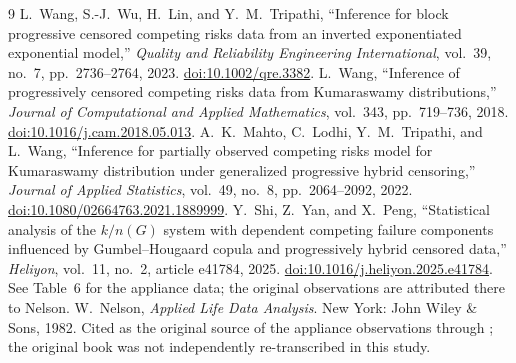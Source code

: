 \documentclass[a4paper,11pt]{article}
\begin{document}
\begin{thebibliography}{9}
 L.~Wang, S.-J.~Wu, H.~Lin, and Y.~M.~Tripathi, ``Inference for block progressive censored competing risks data from an inverted exponentiated exponential model,'' \emph{Quality and Reliability Engineering International}, vol.~39, no.~7, pp.~2736--2764, 2023. \href{https://doi.org/10.1002/qre.3382}{doi:10.1002/qre.3382}.
 L.~Wang, ``Inference of progressively censored competing risks data from Kumaraswamy distributions,'' \emph{Journal of Computational and Applied Mathematics}, vol.~343, pp.~719--736, 2018. \href{https://doi.org/10.1016/j.cam.2018.05.013}{doi:10.1016/j.cam.2018.05.013}.
 A.~K.~Mahto, C.~Lodhi, Y.~M.~Tripathi, and L.~Wang, ``Inference for partially observed competing risks model for Kumaraswamy distribution under generalized progressive hybrid censoring,'' \emph{Journal of Applied Statistics}, vol.~49, no.~8, pp.~2064--2092, 2022. \href{https://doi.org/10.1080/02664763.2021.1889999}{doi:10.1080/02664763.2021.1889999}.
 Y.~Shi, Z.~Yan, and X.~Peng, ``Statistical analysis of the $k/n(G)$ system with dependent competing failure components influenced by Gumbel--Hougaard copula and progressively hybrid censored data,'' \emph{Heliyon}, vol.~11, no.~2, article e41784, 2025. \href{https://doi.org/10.1016/j.heliyon.2025.e41784}{doi:10.1016/j.heliyon.2025.e41784}. See Table~6 for the appliance data; the original observations are attributed there to Nelson.
 W.~Nelson, \emph{Applied Life Data Analysis}. New York: John Wiley \& Sons, 1982. Cited as the original source of the appliance observations through \cite{shi2025}; the original book was not independently re-transcribed in this study.
\end{thebibliography}
\end{document}

